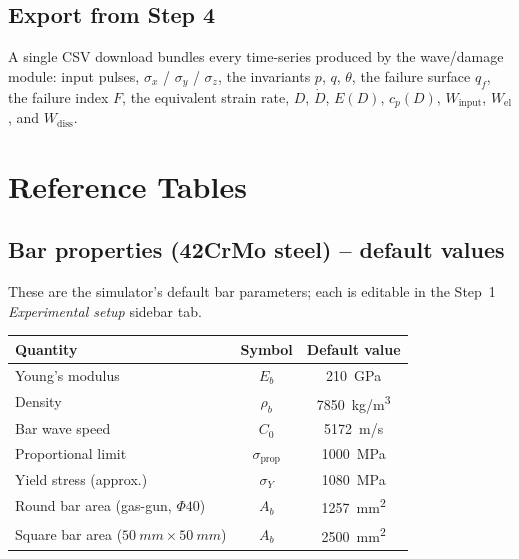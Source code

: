 \documentclass[11pt,a4paper]{article}
\providecommand{\SI}[2]{\qty{#1}{#2}}
\newcommand{\sig}{\sigma}
\newcommand{\Cz}{C_0}
\newcommand{\Ab}{A_b}
\newcommand{\sigprop}{\sig_{\text{prop}}}
\begin{document}
\subsection{Export from Step 4}

A single CSV download bundles every time-series produced by the wave/damage
module: input pulses, $\sig_x$ / $\sig_y$ / $\sig_z$, the invariants $p$, $q$,
$\theta$, the failure surface $q_f$, the failure index $F$, the equivalent
strain rate, $D$, $\dot D$, $E(D)$, $c_p(D)$, $W_{\text{input}}$,
$W_{\text{el}}$, and $W_{\text{diss}}$.

\newpage
\appendix
\section{Reference Tables}

\subsection{Bar properties (42CrMo steel) -- default values}

These are the simulator's default bar parameters; each is editable in the
Step~1 \emph{Experimental setup} sidebar tab.

\begin{center}
\begin{tabular}{@{}lcc@{}}
\toprule
\textbf{Quantity} & \textbf{Symbol} & \textbf{Default value} \\
\midrule
Young's modulus & $E_b$ & \SI{210}{GPa} \\
Density & $\rho_b$ & \SI{7850}{kg/m^3} \\
Bar wave speed & $\Cz$ & \SI{5172}{m/s} \\
Proportional limit & $\sigprop$ & \SI{1000}{MPa} \\
Yield stress (approx.) & $\sigma_Y$ & \SI{1080}{MPa} \\
Round bar area (gas-gun, $\Phi 40$) & $\Ab$ & \SI{1257}{mm^2} \\
Square bar area ($\SI{50}{mm} \times \SI{50}{mm}$) & $\Ab$ & \SI{2500}{mm^2} \\
\bottomrule
\end{tabular}
\end{center}
\end{document}
